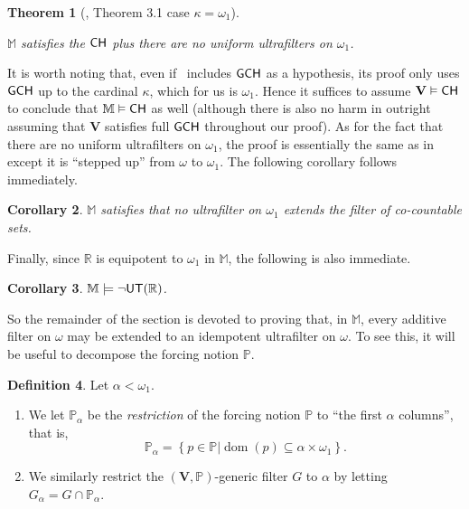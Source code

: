 \documentclass[10pt]{amsart}
\newcommand{\gch}{\mathnormal{\mathsf{GCH}}}
\DeclareMathOperator{\dom}{dom}
\newcommand{\ch}{\mathnormal{\mathsf{CH}}}
\newcommand{\utr}{\mathnormal{\mathsf{UT}(\mathbb R)}}
\newtheorem{theorem}{Theorem}[section]
\newtheorem{corollary}[theorem]{Corollary}
\theoremstyle{definition}
\newtheorem{definition}[theorem]{Definition}
\theoremstyle{remark}
\begin{document}
\begin{theorem}[\cite{modelspectraofuniformity}, Theorem 3.1 case $\kappa=\omega_1$] \label{theorem_1}

$\mathbb{M}$ satisfies the $\ch$ plus there are no uniform ultrafilters on $\omega_1$.
\end{theorem}

It is worth noting that, even if~\cite[Thm. 3.1]{modelspectraofuniformity} includes $\gch$ as a hypothesis, its proof only uses $\gch$ up to the cardinal $\kappa$, which for us is $\omega_1$. Hence it suffices to assume $\mathbf{V}\vDash\ch$ to conclude that $\mathbb M\vDash\ch$ as well (although there is also no harm in outright assuming that $\mathbf{V}$ satisfies full $\gch$ throughout our proof). As for the fact that there are no uniform ultrafilters on $\omega_1$, the proof is essentially the same as in~\cite[pp. 391--392]{halbeisen} except it is ``stepped up'' from $\omega$ to $\omega_1$. The following corollary follows immediately.

\begin{corollary}
$\mathbb{M}$ satisfies that no ultrafilter on $\omega_1$ extends the filter of co-countable sets.
\end{corollary}

Finally, since $\mathbb R$ is equipotent to $\omega_1$ in $\mathbb M$, the following is also immediate.

\begin{corollary}\label{cor:noultrafiltertheorem}
$\mathbb{M} \models \neg\utr$.
\end{corollary}

So the remainder of the section is devoted to proving that, in $\mathbb M$, every additive filter on $\omega$ may be extended to an idempotent ultrafilter on $\omega$. To see this, it will be useful to decompose the forcing notion $\mathbb P$.

\begin{definition}
Let $\alpha<\omega_1$.
\begin{enumerate}
    \item We let $\mathbb P_\alpha$ be the {\it restriction} of the forcing notion $\mathbb P$ to ``the first $\alpha$ columns'', that is, 
    \begin{equation*}
    \mathbb P_\alpha=\left\{p\in \mathbb P\big|\dom(p)\subseteq\alpha\times\omega_1\right\}.
    \end{equation*}
    \item We similarly restrict the $(\mathbf{V},\mathbb P)$-generic filter $G$ to $\alpha$ by letting $G_\alpha=G\cap\mathbb P_\alpha$.
\end{enumerate}
\end{definition}
\end{document}
